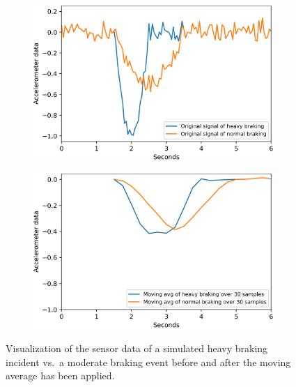 \begin{figure}[t]
	\centering
	\begin{subfigure}[b]{0.475\textwidth}
		\centering
		\includegraphics[width=\textwidth]{fig/heavy_vs_normal_braking}
	\end{subfigure}
	\hfill
	\begin{subfigure}[b]{0.475\textwidth}
		\centering
		\includegraphics[width=\textwidth]{fig/mvn_avg_heavy_vs_normal_braking.png}
	\end{subfigure}	
	\caption{Visualization of the sensor data of a simulated heavy braking incident vs.\ a moderate braking event before and after the moving average has been applied.}
	\label{fig:heavy-vs-normal-braking}
\end{figure}

